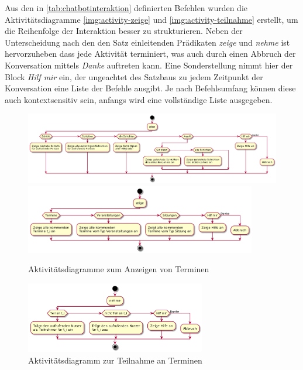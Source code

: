 Aus den in \autoref{tab:chatbotinteraktion} definierten Befehlen wurden die Aktivitätsdiagramme \autoref{img:activity-zeige} und \autoref{img:activity-teilnahme} erstellt, um die Reihenfolge der Interaktion besser zu strukturieren.
Neben der Unterscheidung nach den den Satz einleitenden Prädikaten \textit{zeige} und \textit{nehme} ist hervorzuheben dass jede Aktivität terminiert, was auch durch einen Abbruch der Konversation mittels \textit{Danke} auftreten kann. Eine Sonderstellung nimmt hier der Block \textit{Hilf mir} ein, der ungeachtet des Satzbaus zu jedem Zeitpunkt der Konversation eine Liste der Befehle ausgibt. Je nach Befehlsumfang können diese auch kontextsensitiv sein, anfangs wird eine vollständige Liste ausgegeben.

\begin{figure}[htbp]
    \centering
    \includegraphics[width=\textwidth]{../docs/uml/activity-zeige.png}
    \includegraphics[width=0.9\textwidth]{../docs/uml/activity-zeige2.png}
    \caption{Aktivitätsdiagramme zum Anzeigen von Terminen}
    \label{img:activity-zeige}
\end{figure}

\begin{figure}[htbp]
    \centering
    \includegraphics[width=0.7\textwidth]{../docs/uml/activity-teilnahme.png}
    \caption{Aktivitätsdiagramm zur Teilnahme an Terminen}
    \label{img:activity-teilnahme}
\end{figure}


